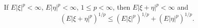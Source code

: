 If $E|\xi|^p < \infty$, $E|\eta|^p < \infty$, $1 \leq p < \infty$, then $E|\xi + \eta|^p < \infty$ and
$$(E|\xi + \eta|^p)^{1/p} \leq (E|\xi|^p)^{1/p} + (E|\eta|^p)^{1/p}.$$
